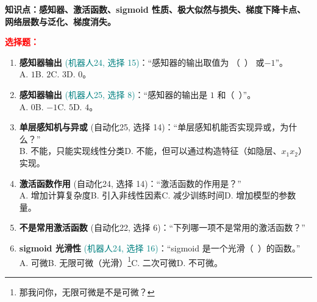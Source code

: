 ﻿\documentclass[../main.tex]{subfiles}
\begin{document}
\noindent\textbf{知识点：感知器、激活函数、sigmoid 性质、极大似然与损失、梯度下降卡点、网络层数与泛化、梯度消失。}

\noindent\textbf{\textcolor{red}{选择题：}}
\begin{enumerate}[itemsep=0.45em, topsep=0.2em, leftmargin=1.5em]
    \item \textbf{感知器输出} \textcolor{teal}{(机器人24, 选择 15)}：``感知器的输出取值为 （\ ） 或$-1$''。\\
    A. $1$\quad B. $2$\quad C. $3$\quad D. $0$。 

    \item \textbf{感知器输出} \textcolor{teal}{(机器人25, 选择 8)}：``感知器的输出是 $1$ 和（\ ）''。\\
    A. $0$\quad B. $-1$\quad C. $5$\quad D. $4$。 

    \item \textbf{单层感知机与异或} \textcolor{autoclassgreen}{(自动化25, 选择 14)}：``单层感知机能否实现异或，为什么？''\\
    \quad B. 不能，只能实现线性分类\quad {}\quad D. 不能，但可以通过构造特征（如隐层、$x_1 x_2$）实现。 

    \item \textbf{激活函数作用} \textcolor{autoclassgreen}{(自动化24, 选择 14)}：``激活函数的作用是？''\\
    A. 增加计算复杂度\quad B. 引入非线性因素\quad C. 减少训练时间\quad D. 增加模型的参数量。 

    \item \textbf{不是常用激活函数} \textcolor{autoclassgreen}{(自动化22, 选择 6)}：``下列哪一项不是常用的激活函数？''\\
     

    \item \textbf{sigmoid 光滑性} \textcolor{teal}{(机器人24, 选择 16)}：``sigmoid 是一个光滑（\ ）的函数。''\\
    A. 可微\quad B. 无限可微（光滑）\footnote{那我问你，无限可微是不是可微？}\quad C. 二次可微\quad D. 不可微。 


\end{enumerate}
\end{document}
